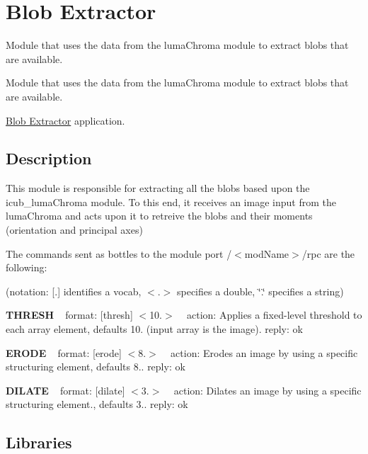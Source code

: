 \section{Blob Extractor}
\label{group__icub__blobExtractor}


Module that uses the data from the luma\+Chroma module to extract blobs that are available.  


Module that uses the data from the luma\+Chroma module to extract blobs that are available. 

\hyperlink{group__icub__blobExtractor}{Blob Extractor} application.\hypertarget{group__seg2cloud_intro_sec}{}\subsection{Description}\label{group__seg2cloud_intro_sec}
This module is responsible for extracting all the blobs based upon the icub\+\_\+luma\+Chroma module. To this end, it receives an image input from the luma\+Chroma and acts upon it to retreive the blobs and their moments (orientation and principal axes)

The commands sent as bottles to the module port /$<$mod\+Name$>$/rpc are the following\+:

(notation\+: \mbox{[}.\mbox{]} identifies a vocab, $<$.$>$ specifies a double, \char`\"{}.\char`\"{} specifies a string)

{\bfseries T\+H\+R\+E\+SH} ~\newline
format\+: \mbox{[}thresh\mbox{]} $<$10.$>$ ~\newline
action\+: Applies a fixed-\/level threshold to each array element, defaults 10. (input array is the image). reply\+: ok

{\bfseries E\+R\+O\+DE} ~\newline
format\+: \mbox{[}erode\mbox{]} $<$8.$>$ ~\newline
action\+: Erodes an image by using a specific structuring element, defaults 8.. reply\+: ok

{\bfseries D\+I\+L\+A\+TE} ~\newline
format\+: \mbox{[}dilate\mbox{]} $<$3.$>$ ~\newline
action\+: Dilates an image by using a specific structuring element., defaults 3.. reply\+: ok\hypertarget{group__icub__blobExtractor_lib_sec}{}\subsection{Libraries}\label{group__icub__blobExtractor_lib_sec}

